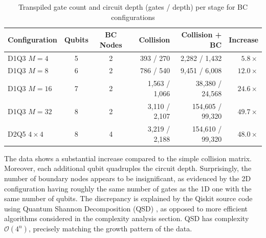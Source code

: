 \begin{table}[H]
\centering
\caption{Transpiled gate count and circuit depth (gates / depth) per stage for BC configurations}
\label{tab:transpilation_bc}
\begin{tabular}{l c c r r r}
\toprule
Configuration & Qubits & BC Nodes & Collision & Collision + BC & Increase \\
\midrule
D1Q3 $M{=}4$  & 5 & 2 & 393 / 270         & 2{,}282 / 1{,}432    & $5.8\times$ \\
D1Q3 $M{=}8$  & 6 & 2 & 786 / 540         & 9{,}451 / 6{,}008    & $12.0\times$ \\
D1Q3 $M{=}16$ & 7 & 2 & 1{,}563 / 1{,}066 & 38{,}380 / 24{,}568  & $24.6\times$ \\
D1Q3 $M{=}32$ & 8 & 2 & 3{,}110 / 2{,}107 & 154{,}605 / 99{,}320 & $49.7\times$ \\
\midrule
D2Q5 $4{\times}4$ & 8 & 4 & 3{,}219 / 2{,}188 & 154{,}610 / 99{,}320 & $48.0\times$ \\
\bottomrule
\end{tabular}
\end{table}

The data shows a substantial increase compared to the simple collision matrix. Moreover, each additional qubit quadruples the circuit depth.
Surprisingly, the number of boundary nodes appears to be insignificant, as evidenced by the 2D configuration having roughly the same number of gates as the 1D one with the same number of qubits.
The discrepancy is explained by the Qiskit source code using Quantum Shannon Decomposition (QSD) \cite{shende2006synthesis}, as opposed to more efficient algorithms considered in the complexity analysis section.
QSD has complexity $\mathcal{O}(4^n)$, precisely matching the growth pattern of the data.